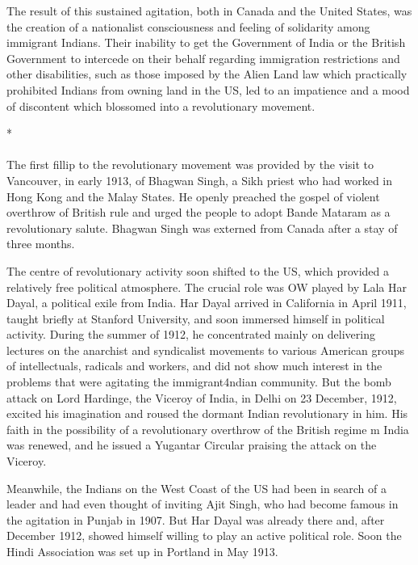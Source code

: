 The result of this sustained agitation, both in Canada and the United States, was the creation of a nationalist consciousness and feeling of solidarity among immigrant Indians. Their inability to get the Government of India or the British Government to intercede on their behalf regarding immigration restrictions and other disabilities, such as those imposed by the Alien Land law which practically prohibited Indians from owning land in the US, led to an impatience and a mood of discontent which blossomed into a revolutionary movement.

\begin{center}*\end{center}

\paragraph*{}


The first fillip to the revolutionary movement was provided by the visit to Vancouver, in early 1913, of Bhagwan Singh, a Sikh priest who had worked in Hong Kong and the Malay States. He openly preached the gospel of violent overthrow of British rule and urged the people to adopt Bande Mataram as a revolutionary salute. Bhagwan Singh was externed from Canada after a stay of three months.

The centre of revolutionary activity soon shifted to the US, which provided a relatively free political atmosphere. The crucial role was OW played by Lala Har Dayal, a political exile from India. Har Dayal arrived in California in April 1911, taught briefly at Stanford University, and soon immersed himself in political activity. During the summer of 1912, he concentrated mainly on delivering lectures on the anarchist and syndicalist movements to various American groups of intellectuals, radicals and workers, and did not show much interest in the problems that were agitating the immigrant4ndian community. But the bomb attack on Lord Hardinge, the Viceroy of India, in Delhi on 23 December, 1912, excited his imagination and roused the dormant Indian revolutionary in him. His faith in the possibility of a revolutionary overthrow of the British regime m India was renewed, and he issued a Yugantar Circular praising the attack on the Viceroy.

Meanwhile, the Indians on the West Coast of the US had been in search of a leader and had even thought of inviting Ajit Singh, who had become famous in the agitation in Punjab in 1907. But Har Dayal was already there and, after December 1912, showed himself willing to play an active political role. Soon the Hindi Association was set up in Portland in May 1913.

